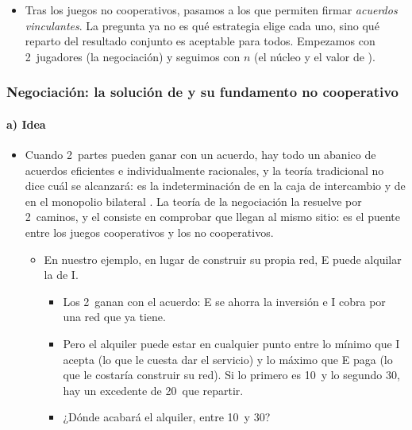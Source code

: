 \documentclass[11pt]{article}
\begin{document}
\begin{itemize}
\item Tras los juegos no cooperativos, pasamos a los que permiten firmar \emph{acuerdos vinculantes}. La pregunta ya no es qué estrategia elige cada uno, sino qué reparto del resultado conjunto es aceptable para todos. Empezamos con 2~jugadores (la negociación) y seguimos con $n$ (el núcleo y el valor de ).
\end{itemize}

\subsubsection{Negociación: la solución de  y su fundamento no cooperativo}\label{sec:negociacion}

\paragraph{a) Idea}

\begin{itemize}
\item Cuando 2~partes pueden ganar con un acuerdo, hay todo un abanico de acuerdos eficientes e individualmente racionales, y la teoría tradicional no dice cuál se alcanzará: es la indeterminación de  en la caja de intercambio  y de  en el monopolio bilateral . La teoría de la negociación la resuelve por 2~caminos, y el  consiste en comprobar que llegan al mismo sitio: es el puente entre los juegos cooperativos y los no cooperativos.
  \begin{itemize}
  \item En nuestro ejemplo, en lugar de construir su propia red, E puede alquilar la de \textup{I}.
    \begin{itemize}
    \item Los 2~ganan con el acuerdo: E se ahorra la inversión e \textup{I} cobra por una red que ya tiene.
    \item Pero el alquiler puede estar en cualquier punto entre lo mínimo que \textup{I} acepta (lo que le cuesta dar el servicio) y lo máximo que E paga (lo que le costaría construir su red). Si lo primero es 10~y lo segundo 30, hay un excedente de 20~que repartir.
    \item ¿Dónde acabará el alquiler, entre 10~y 30?
    \end{itemize}
  \end{itemize}
\end{itemize}
\end{document}
